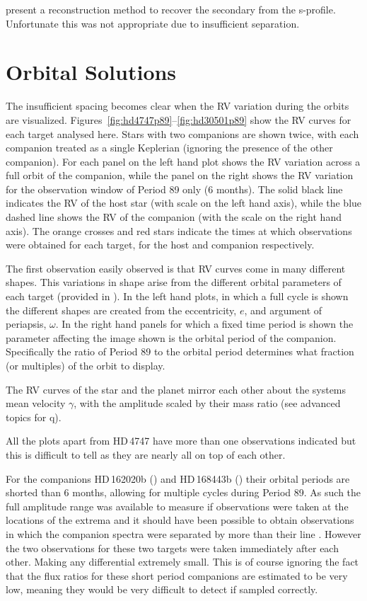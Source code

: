 \citet{ferluga_separating_1997} present a reconstruction method to recover the secondary from the s-profile. Unfortunate this was not appropriate due to insufficient separation.


\section{Orbital Solutions}
\label{sec:orbtial_diagrams}
The insufficient spacing becomes clear when the RV variation during the orbits are visualized. Figures~\ref{fig:hd4747p89}--\ref{fig:hd30501p89} show the RV curves for each target analysed here.
Stars with two companions are shown twice, with each companion treated as a single Keplerian (ignoring the presence of the other companion).
For each panel on the left hand plot shows the RV variation across a full orbit of the companion, while the panel on the right shows the RV variation for the observation window of Period 89 only (6 months).
The solid black line indicates the RV of the host star (with scale on the left hand axis), while the blue dashed line shows the RV of the companion (with the scale on the right hand axis).
The orange crosses and red stars indicate the times at which observations were obtained for each target, for the host and companion respectively.

The first observation easily observed is that RV curves come in many different shapes. This variations in shape arise from the different orbital parameters of each target (provided in ). In the left hand plots, in which a full cycle is shown the different shapes are created from the eccentricity, $e$, and argument of periapsis, $\omega$. In the right hand panels for which a fixed time period is shown the parameter affecting the image shown is the orbital period of the companion. Specifically the ratio of Period 89 to the orbital period determines what fraction (or multiples) of the orbit to display.

The RV curves of the star and the planet mirror each other about the systems mean velocity $\gamma$, with the amplitude scaled by their mass ratio (see \eref{} advanced topics for q).

All the plots apart from {HD\,4747} have more than one observations indicated but this is difficult to tell as they are nearly all on top of each other.

For the companions {HD\,162020}b () and {HD\,168443}b () their orbital periods are shorted than 6 months, allowing for multiple cycles during Period 89. As such the full amplitude range was available to measure if observations were taken at the locations of the extrema and it should have been possible to obtain observations in which the companion spectra were separated by more than their line \fwhm. However the two observations for these two targets were taken immediately after each other. Making any differential extremely small. This is of course ignoring the fact that the flux ratios for these short period companions are estimated to be very low, meaning they would be very difficult to detect if sampled correctly.

